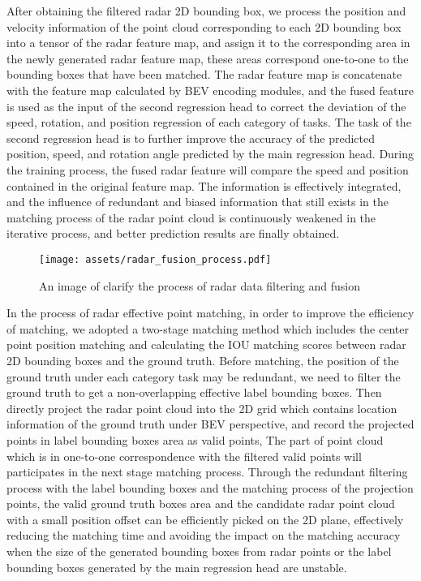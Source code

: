 \documentclass[10pt,twocolumn,letterpaper]{article}
\begin{document}
After obtaining the filtered radar 2D bounding box, we process the position and velocity information of the point cloud corresponding to each 2D bounding box into a tensor of the radar feature map, and assign it to the corresponding area in the newly generated radar feature map, these areas correspond one-to-one to the bounding boxes that have been matched. The radar feature map is concatenate with the feature map calculated by BEV encoding modules, and the fused feature is used as the input of the second regression head to correct the deviation of the speed, rotation, and position regression of each category of tasks. The task of the second regression head is to further improve the accuracy of the predicted position, speed, and rotation angle predicted by the main regression head. During the training process, the fused radar feature will compare the speed and position contained in the original feature map. The information is effectively integrated, and the influence of redundant and biased information that still exists in the matching process of the radar point cloud is continuously weakened in the iterative process, and better prediction results are finally obtained.
\begin{figure*}[t]
    \vspace{-0.9cm}
    \setlength{\abovecaptionskip}{0.1cm} \setlength{\belowcaptionskip}{0.1cm} \centering
    \texttt{[image: assets/radar\_fusion\_process.pdf]}
    \caption{An image of clarify the process of radar data filtering and fusion}
    \label{fig:radar_process}
\end{figure*}
In the process of radar effective point matching, in order to improve the efficiency of matching, we adopted a two-stage matching method which includes the center point position matching and calculating the IOU matching scores between radar 2D bounding boxes and the ground truth. Before matching, the position of the ground truth under each category task may be redundant, we need to filter the ground truth to get a non-overlapping effective label bounding boxes. Then directly project the radar point cloud into the 2D grid which contains location information of the ground truth under BEV perspective, and record the projected points in label bounding boxes area as valid points, The part of point cloud which is in one-to-one correspondence with the filtered valid points will participates in the next stage matching process. Through the redundant filtering process with the label bounding boxes and the matching process of the projection points, the valid ground truth boxes area and the candidate radar point cloud with a small position offset can be efficiently picked on the 2D plane, effectively reducing the matching time and avoiding the impact on the matching accuracy when the size of the generated bounding boxes from radar points or the label bounding boxes generated by the main regression head are unstable.
\end{document}
